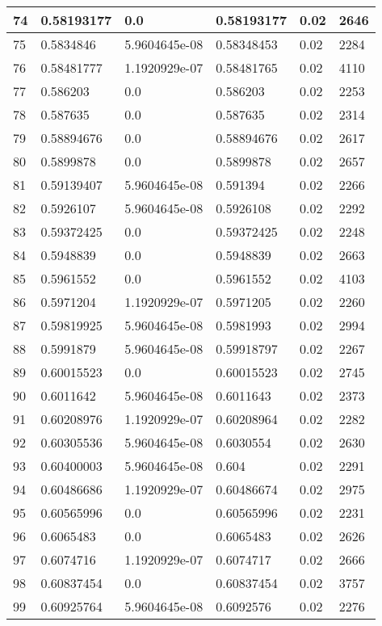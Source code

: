 \begin{longtable}{|l|l|l|l|l|l|}
74 & 0.58193177 & 0.0 & 0.58193177 & 0.02 & 2646 \\ \hline 
75 & 0.5834846 & 5.9604645e-08 & 0.58348453 & 0.02 & 2284 \\ \hline 
76 & 0.58481777 & 1.1920929e-07 & 0.58481765 & 0.02 & 4110 \\ \hline 
77 & 0.586203 & 0.0 & 0.586203 & 0.02 & 2253 \\ \hline 
78 & 0.587635 & 0.0 & 0.587635 & 0.02 & 2314 \\ \hline 
79 & 0.58894676 & 0.0 & 0.58894676 & 0.02 & 2617 \\ \hline 
80 & 0.5899878 & 0.0 & 0.5899878 & 0.02 & 2657 \\ \hline 
81 & 0.59139407 & 5.9604645e-08 & 0.591394 & 0.02 & 2266 \\ \hline 
82 & 0.5926107 & 5.9604645e-08 & 0.5926108 & 0.02 & 2292 \\ \hline 
83 & 0.59372425 & 0.0 & 0.59372425 & 0.02 & 2248 \\ \hline 
84 & 0.5948839 & 0.0 & 0.5948839 & 0.02 & 2663 \\ \hline 
85 & 0.5961552 & 0.0 & 0.5961552 & 0.02 & 4103 \\ \hline 
86 & 0.5971204 & 1.1920929e-07 & 0.5971205 & 0.02 & 2260 \\ \hline 
87 & 0.59819925 & 5.9604645e-08 & 0.5981993 & 0.02 & 2994 \\ \hline 
88 & 0.5991879 & 5.9604645e-08 & 0.59918797 & 0.02 & 2267 \\ \hline 
89 & 0.60015523 & 0.0 & 0.60015523 & 0.02 & 2745 \\ \hline 
90 & 0.6011642 & 5.9604645e-08 & 0.6011643 & 0.02 & 2373 \\ \hline 
91 & 0.60208976 & 1.1920929e-07 & 0.60208964 & 0.02 & 2282 \\ \hline 
92 & 0.60305536 & 5.9604645e-08 & 0.6030554 & 0.02 & 2630 \\ \hline 
93 & 0.60400003 & 5.9604645e-08 & 0.604 & 0.02 & 2291 \\ \hline 
94 & 0.60486686 & 1.1920929e-07 & 0.60486674 & 0.02 & 2975 \\ \hline 
95 & 0.60565996 & 0.0 & 0.60565996 & 0.02 & 2231 \\ \hline 
96 & 0.6065483 & 0.0 & 0.6065483 & 0.02 & 2626 \\ \hline 
97 & 0.6074716 & 1.1920929e-07 & 0.6074717 & 0.02 & 2666 \\ \hline 
98 & 0.60837454 & 0.0 & 0.60837454 & 0.02 & 3757 \\ \hline 
99 & 0.60925764 & 5.9604645e-08 & 0.6092576 & 0.02 & 2276 \\ \hline 

\end{longtable}
